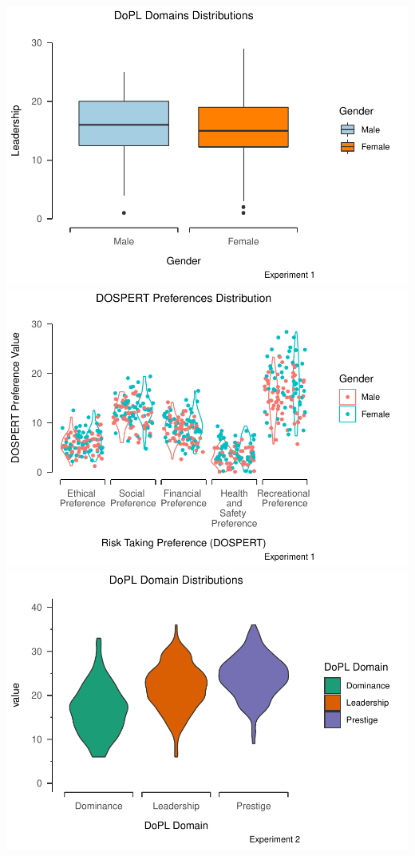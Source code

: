\documentclass[
  donotrepeattitle,doc, 12pt, a4paper,floatsintext]{apa7}
\begin{document}
\includegraphics{Output_Files/DoPL-Experiment_files/figure-latex/Leadership-1.pdf}
\includegraphics{Output_Files/DoPL-Experiment_files/figure-latex/DOSPERT Preferences_Gender-1.pdf}
\includegraphics{Output_Files/DoPL-Experiment_files/figure-latex/DoPL Domains Experiment 2-1.pdf}
\end{document}
